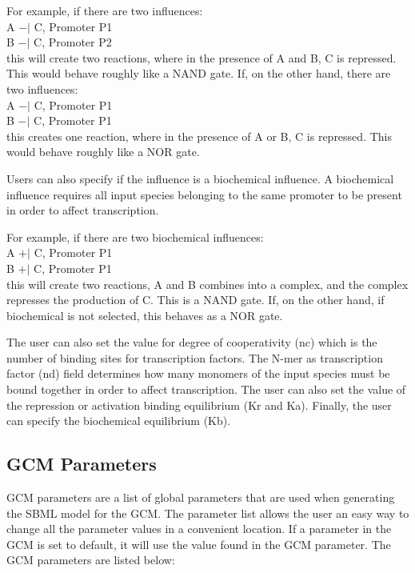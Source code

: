 \documentclass[titlepage,11pt]{article}
\begin{document}
For example, if there are two influences:\\
A $-|$ C, Promoter P1\\
B $-|$ C, Promoter P2\\
this will create two reactions, where in the presence of A and
B, C is repressed.  This would behave roughly like a NAND gate. 
If, on the other hand, there are two influences:\\
A $-|$ C, Promoter P1\\
B $-|$ C, Promoter P1\\
this creates one reaction, where in the presence of A or
B, C is repressed.  This would behave roughly like a NOR gate.

Users can also specify if the influence is a biochemical
influence.  A biochemical influence requires all input species
belonging to the same promoter to be present in order to affect
transcription. 

For example, if there are two biochemical influences:\\
A $+|$ C, Promoter P1\\
B $+|$ C, Promoter P1\\
this will create two reactions, A and B combines into a
complex, and the complex represses the production of C. This is a
NAND gate. If, on the other hand, if biochemical is not selected,
this behaves as a NOR gate.

The user can also set the value for degree of cooperativity (nc) 
which is the number of binding sites for transcription factors. 
The N-mer as transcription factor (nd) field determines how many 
monomers of the input species
must be bound together in order to affect transcription.  The user
can also set the value of the repression or activation binding equilibrium
(Kr and Ka).  Finally, the user can specify the biochemical equilibrium
(Kb).

\subsection{\label{GCMParameters}GCM Parameters}

\noindent
GCM parameters are a list of global parameters that are used
when generating the SBML model for the GCM.  The parameter list
allows the user an easy way to change all the parameter values in
a convenient location.  If a parameter in the GCM is set to
default, it will use the value found in the GCM parameter.  The 
GCM parameters are listed below:
\end{document}
